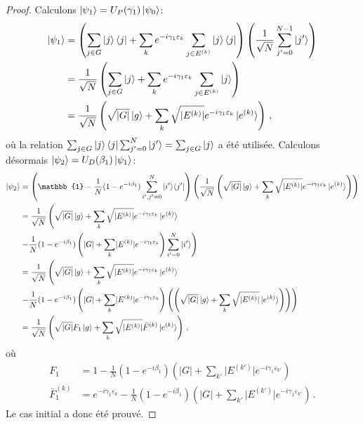 \begin{proof}
Calculons $\ket{\psi_{1}} = U_{P}(\gamma_{1}) \ket{\psi_{0}}$:
\begin{equation}
\begin{aligned}
    \ket{\psi_{1}} & = \left(\sum_{j \in G} \ket{j}\bra{j} + \sum_{k} e^{-i \gamma_{1} \varepsilon_{k}} \sum_{j \in E^{(k)}} \ket{j}\bra{j} \right) \left( \frac{1}{ \sqrt{ N }} \sum_{j'=0}^{N-1} \ket{j'} \right) \\
    & = \frac{1}{ \sqrt{ N }} \left( \sum_{j \in G} \ket{j} + \sum_{k} e^{-i \gamma_{1} \varepsilon_{k}} \sum_{j \in E^{(k)}} \ket{j} \right) \\
    & = \frac{1}{ \sqrt{ N }} \left( \sqrt{ \lvert G \rvert  } \ket{g} + \sum_{k} \sqrt{ \lvert E^{(k)} \rvert  } e^{-i \gamma_{1} \varepsilon_{k}} \ket{e^{(k)}} \right) \,,
\end{aligned}
\end{equation}
où la relation $\sum_{j \in G}\ket{j}\bra{j} \sum_{j'=0}^{N} \ket{j'} = \sum_{j \in G} \ket{j}$ a été utilisée. Calculons désormais $\ket{\psi_{2}} = U_{D} (\beta_{1})\ket{\psi_{1}}$:
\begin{equation}
\begin{aligned}
    \ket{\psi_{2}} &= \left( \mathbb{1} - \frac{1}{N} (1 - e^{-i\beta_{1}}) \sum_{i',j'=0}^{N} \ket{i'}\!\bra{j'} \right) \left( \frac{1}{ \sqrt{ N }} \left( \sqrt{ \lvert G \rvert  } \ket{g} + \sum_{k} \sqrt{ \lvert E^{(k)} \rvert  } e^{-i \gamma_{1} \varepsilon_{k}}  \ket{e^{(k)}} \right) \right) \\
    &=  \frac{1}{ \sqrt{ N }} \left( \sqrt{ \lvert G \rvert  } \ket{g} + \sum_{k} \sqrt{ \lvert E^{(k)} \rvert  } e^{-i \gamma_{1} \varepsilon_{k}}  \ket{e^{(k)}} \right. \\
    & \left. - \frac{1}{N} (1 - e^{-i\beta_{1}}) \left( \lvert G \rvert + \sum_{k} \lvert E^{(k)} \rvert e^{-i \gamma_{1} \varepsilon_{k}} \right) \sum_{i'=0}^{N} \ket{i'} \right) \\
    &=  \frac{1}{ \sqrt{ N }} \left( \sqrt{ \lvert G \rvert  } \ket{g} + \sum_{k} \sqrt{ \lvert E^{(k)} \rvert  } e^{-i \gamma_{1} \varepsilon_{k}}  \ket{e^{(k)}} \right. \\
    & \left. - \frac{1}{N} (1 - e^{-i\beta_{1}}) \left( \lvert G \rvert + \sum_{k} \lvert E^{(k)} \rvert e^{-i \gamma_{1} \varepsilon_{k}}   \right) \left( \left( \sqrt{ \lvert G \rvert  } \ket{g} + \sum_{k} \sqrt{ \lvert E^{(k)} \rvert } \ket{e^{(k)}} \right) \right) \right) \\
    &= \frac{1}{\sqrt{ N }} \left( \sqrt{ \lvert G \rvert } F_{1} \ket{g} + \sum_{k} \sqrt{ \lvert E^{(k)} \rvert } \bar{F}^{(k)} \ket{e^{(k)}} \right) \,,
\end{aligned}
\end{equation}
où 
\begin{align}
    F_{1} &= 1 - \frac{1}{N} (1 - e^{-i\beta_{1}}) \left(  \lvert G \rvert + \sum_{k'} \lvert E^{(k')} \rvert e^{-i \gamma_{1} \varepsilon_{k'}} \right) \\
    \bar{F}^{(k)}_{1} &= e^{-i\gamma_{1} \varepsilon_{k}} - \frac{1}{N} (1 - e^{-i\beta_{1}}) \left(  \lvert G \rvert + \sum_{k'} \lvert E^{(k')} \rvert e^{-i \gamma_{1} \varepsilon_{k'}} \right) \,.
\end{align}
Le cas initial a donc été prouvé.


\end{proof}
